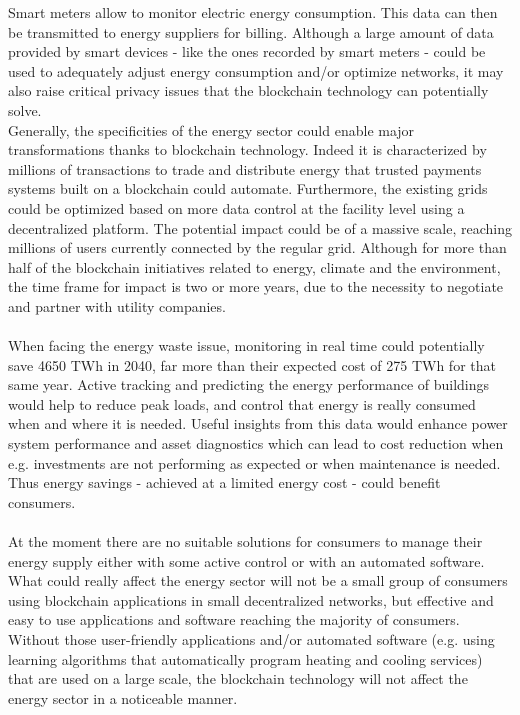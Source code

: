 \documentclass[11pt]{article}
\begin{document}
Smart meters allow to monitor electric energy consumption. This data can then be transmitted to energy suppliers for billing. Although a large amount of data provided by smart devices - like the ones recorded by smart meters - could be used to adequately adjust energy consumption and/or optimize networks, it may also raise critical privacy issues \cite{4} that the blockchain technology can potentially solve.\\
Generally, the specificities of the energy sector could enable major transformations thanks to blockchain technology. \color{red}Indeed it is characterized by millions of transactions to trade and distribute energy that trusted payments systems built on a blockchain could automate. \color{black} Furthermore, the existing grids could be optimized based on more data control at the facility level using a decentralized platform. The potential impact could be of a massive scale, reaching millions of users currently connected by the regular grid. Although for more than half of the blockchain initiatives related to energy, climate and the environment, the time frame for impact is two or more years, due to the necessity to negotiate and partner with utility companies.\cite{5}\\\\
When facing the energy waste issue, monitoring in real time could potentially save 4650 TWh in 2040, far more than their expected cost of 275 TWh for that same year. Active tracking and predicting the energy performance of buildings would help to reduce peak loads, and control that energy is really consumed when and where it is needed. Useful insights from this data would enhance power system performance and asset diagnostics which can lead to cost reduction when e.g. investments are not performing as expected or when maintenance is needed. Thus energy savings - achieved at a limited energy cost - could benefit consumers.\cite{6}\\\\
At the moment there are no suitable solutions for consumers to manage their energy supply either with some active control or with an automated software. What could really affect the energy sector will not be a small group of consumers using blockchain applications in small decentralized networks, but effective and easy to use applications and software reaching the majority of consumers. Without those user-friendly applications and/or automated software (e.g. using learning algorithms that automatically program heating and cooling services) that are used on a large scale, the blockchain technology will not affect the energy sector in a noticeable manner.\cite{7}\\\\
\end{document}
